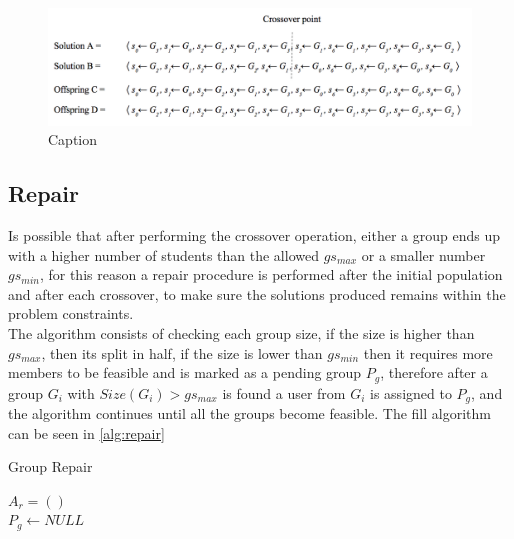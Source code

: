 \begin{figure}
    \centering
    \includegraphics[width=1.1\textwidth]{images/cross_over_g.png}
    \caption{Caption}
    \label{fig:my_label}
\end{figure}


\subsection{Repair}

Is possible that after performing the crossover operation, either a group ends up with a higher number of students than the allowed $gs_{max}$ or a smaller number $gs_{min}$, for this reason a repair procedure is performed after the initial population and after each crossover, to make sure the solutions produced remains within the problem constraints.\\

The algorithm consists of checking each group size, if the size is higher than $gs_{max}$, then its split in half, if the size is lower than $gs_{min}$ then it requires more members to be feasible and is marked as a pending group $P_g$, therefore after a group $G_i$ with $Size(G_i) > gs_{max}$ is found a user from $G_i$ is assigned to $P_g$, and the algorithm continues until all the groups become feasible.
The fill algorithm can be seen in \ref{alg:repair}

\begin{algorithm}[H]
    \caption{Group Repair}
    \label{alg:repair}
    \SetAlgoLined 
    $A_r = ()$\;\\
    $P_g \leftarrow NULL$\;\\
\end{algorithm}

